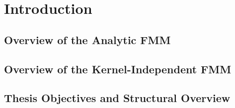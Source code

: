 \chapter{Introduction}\label{chpt:1_introduction}
\section{Overview of the Analytic FMM}\label{sec:1_1_fmm_overview}

\section{Overview of the Kernel-Independent FMM}\label{sec:1_2_kifmm_overview}

\section{Thesis Objectives and Structural Overview}
